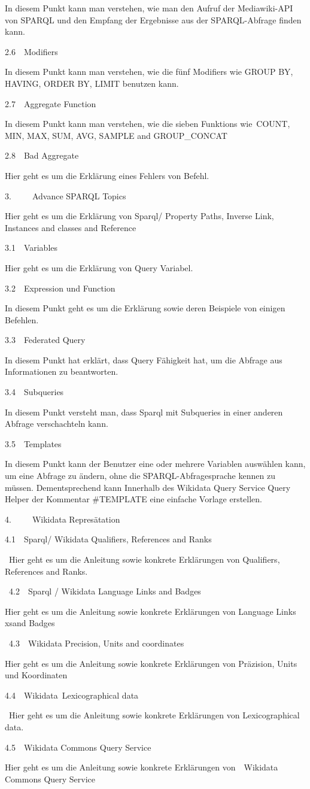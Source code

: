 \documentclass{article}
\begin{document}
In diesem Punkt kann man verstehen, wie man den Aufruf der Mediawiki-API von SPARQL und den Empfang der Ergebnisse aus der SPARQL-Abfrage finden kann.


2.6  Modifiers


In diesem Punkt kann man verstehen, wie die fünf Modifiers wie GROUP BY, HAVING, ORDER BY, LIMIT benutzen kann.


2.7  Aggregate Function


In diesem Punkt kann man verstehen, wie die sieben Funktions wie COUNT, MIN, MAX, SUM, AVG, SAMPLE and GROUP\_CONCAT 


2.8  Bad Aggregate 


Hier geht es um die Erklärung eines Fehlers von Befehl. 


3.     Advance SPARQL Topics


Hier geht es um die Erklärung von Sparql/ Property Paths, Inverse Link, Instances and classes and Reference 


3.1  Variables 


Hier geht es um die Erklärung von Query Variabel.


3.2  Expression und Function


In diesem Punkt geht es um die Erklärung sowie deren Beispiele von einigen Befehlen.


3.3  Federated Query


In diesem Punkt hat erklärt, dass Query Fähigkeit hat, um die Abfrage aus Informationen zu beantworten.


3.4  Subqueries


In diesem Punkt versteht man, dass Sparql mit Subqueries in einer anderen Abfrage verschachteln kann.


3.5  Templates 


In diesem Punkt kann der Benutzer eine oder mehrere Variablen auswählen kann, um eine Abfrage zu ändern, ohne die SPARQL-Abfragesprache kennen zu müssen. Dementsprechend kann Innerhalb des Wikidata Query Service Query Helper der Kommentar \#TEMPLATE eine einfache Vorlage erstellen.


4.     Wikidata Represätation 


4.1  Sparql/ Wikidata Qualifiers, References and Ranks


 Hier geht es um die Anleitung sowie konkrete Erklärungen von Qualifiers, References and Ranks.


 4.2  Sparql / Wikidata Language Links and Badges


Hier geht es um die Anleitung sowie konkrete Erklärungen von Language Links xsand Badges


 4.3  Wikidata Precision, Units and coordinates 


Hier geht es um die Anleitung sowie konkrete Erklärungen von Präzision, Units und Koordinaten


4.4  Wikidata Lexicographical data


 Hier geht es um die Anleitung sowie konkrete Erklärungen von Lexicographical data.


4.5  Wikidata Commons Query Service 


Hier geht es um die Anleitung sowie konkrete Erklärungen von  Wikidata Commons Query Service


\printbibliography[title={Literaturverzeichnis}]
\end{document}
